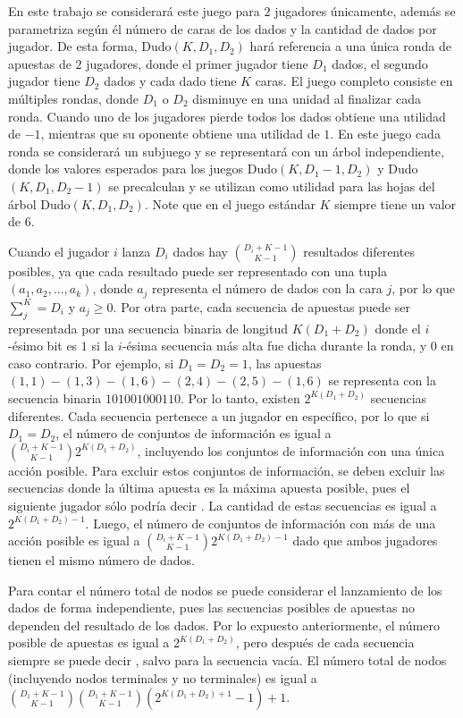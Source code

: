 En este trabajo se considerará este juego para $2$ jugadores únicamente, además se parametriza según él número de caras de los dados y la cantidad de dados por jugador. De esta forma,
Dudo$(K, D_1, D_2)$ hará referencia a una única ronda de apuestas de $2$ jugadores, donde el primer jugador tiene $D_1$ dados, el segundo jugador tiene $D_2$ dados y cada dado tiene $K$ caras. El juego completo consiste en múltiples rondas, donde $D_1$ o $D_2$ disminuye en una unidad al finalizar cada ronda. Cuando uno de los jugadores pierde todos los dados obtiene una utilidad de $-1$, mientras que su oponente obtiene una utilidad de $1$. En este juego cada ronda se considerará un subjuego y se representará con un árbol independiente, donde los valores esperados para los juegos Dudo$(K, D_1 - 1, D_2)$ y Dudo$(K, D_1, D_2 - 1)$ se precalculan y se utilizan como utilidad para las hojas del árbol Dudo$(K, D_1, D_2)$. Note que en el juego estándar $K$ siempre tiene un valor de $6$.

Cuando el jugador $i$ lanza $D_i$ dados hay $\binom{D_i+K-1}{K-1}$ resultados diferentes posibles, ya que cada resultado puede ser representado con una tupla $(a_1, a_2, ..., a_k)$, donde $a_j$ representa el número de dados con la cara $j$, por lo que $\sum_j^K = D_i$ y $a_j \geq 0$. Por otra parte, cada secuencia de apuestas puede ser representada por una secuencia binaria de longitud $K(D_1 + D_2)$ donde el $i$-ésimo bit es $1$ si la $i$-ésima secuencia más alta fue dicha durante la ronda, y $0$ en caso contrario. Por ejemplo, si $D_1 = D_2 = 1$, las apuestas $(1, 1)-(1, 3)-(1, 6)-(2, 4)-(2, 5)-(1, 6)$ se representa con la secuencia binaria $101001000110$. Por lo tanto, existen $2^{K(D_1 + D_2)}$ secuencias diferentes. Cada secuencia pertenece a un jugador en específico, por lo que si $D_1 = D_2$, el número de conjuntos de información es igual a  $\binom{D_i+K-1}{K-1}2^{K(D_1 + D_2)}$, incluyendo los conjuntos de información con una única acción posible. Para excluir estos conjuntos de información, se deben excluir las secuencias donde la última apuesta es la máxima apuesta posible, pues el siguiente jugador sólo podría decir . La cantidad de estas secuencias es igual a $2^{K(D_1 + D_2)-1}$. Luego, el número de conjuntos de información con más de una acción posible es igual a $\binom{D_i+K-1}{K-1}2^{K(D_1 + D_2)-1}$ dado que ambos jugadores tienen el mismo número de dados.

Para contar el número total de nodos se puede considerar el lanzamiento de los dados de forma independiente, pues las secuencias posibles de apuestas no dependen del resultado de los dados. Por lo expuesto anteriormente, el número posible de apuestas es igual a $2^{K(D_1+D_2)}$, pero después de cada secuencia siempre se puede decir , salvo para la secuencia vacía. El número total de nodos (incluyendo nodos terminales y no terminales) es igual a $\binom{D_1+K-1}{K-1}\binom{D_1+K-1}{K-1}(2^{K(D_1+D_2)+1}-1)+1$.


